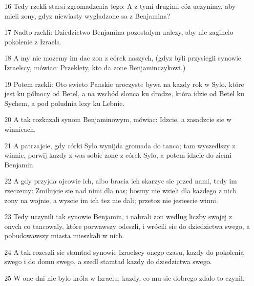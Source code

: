\par 16 Tedy rzekli starsi zgromadzenia tego: A z tymi drugimi cóz uczynimy, aby mieli zony, gdyz niewiasty wygladzone sa z Benjamina?
\par 17 Nadto rzekli: Dziedzictwo Benjamina pozostalym nalezy, aby nie zaginelo pokolenie z Izraela.
\par 18 A my nie mozemy im dac zon z córek naszych, (gdyz byli przysiegli synowie Izraelscy, mówiac: Przeklety, kto da zone Benjaminczykowi.)
\par 19 Potem rzekli: Oto swieto Panskie uroczyste bywa na kazdy rok w Sylo, które jest ku pólnocy od Betel, a na wschód slonca ku drodze, która idzie od Betel ku Sychem, a pod poludnia lezy ku Lebnie.
\par 20 A tak rozkazali synom Benjaminowym, mówiac: Idzcie, a zasadzcie sie w winnicach,
\par 21 A patrzajcie, gdy córki Sylo wynijda gromada do tanca; tam wyszedlszy z winnic, porwij kazdy z was sobie zone z córek Sylo, a potem idzcie do ziemi Benjamin.
\par 22 A gdy przyjda ojcowie ich, albo bracia ich skarzyc sie przed nami, tedy im rzeczemy: Zmilujcie sie nad nimi dla nas; bosmy nie wzieli dla kazdego z nich zony na wojnie, a wyscie im ich tez nie dali; przetoz nie jestescie winni.
\par 23 Tedy uczynili tak synowie Benjamin, i nabrali zon wedlug liczby swojej z onych co tancowaly, które porwawszy odeszli, i wrócili sie do dziedzictwa swego, a pobudowawszy miasta mieszkali w nich.
\par 24 A tak rozeszli sie stamtad synowie Izraelscy onego czasu, kazdy do pokolenia swego i do domu swego, a szedl stamtad kazdy do dziedzictwa swego.
\par 25 W one dni nie bylo króla w Izraelu; kazdy, co mu sie dobrego zdalo to czynil.


